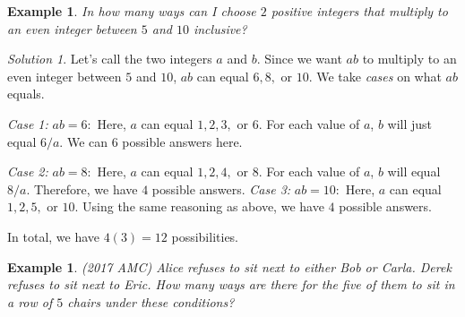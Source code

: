 \documentclass[letterpaper]{article}
\newtheorem{example}[thm]{Example}
\theoremstyle{remark}
\newtheorem*{solution}{Solution}
\theoremstyle{definition}
\begin{document}
\begin{example}
In how many ways can I choose $2$ positive integers that multiply to an even integer between $5$ and $10$ inclusive?
\end{example}

\begin{solution}


Let's call the two integers $a$ and $b$. Since we want $ab$ to multiply to an even integer between $5$ and $10$, $ab$ can equal $6, 8, $ or $10$. We take \textit{cases} on what $ab$ equals.
\newline

\textit{Case 1:} $ab=6:$ Here, $a$ can equal $1, 2, 3,$ or $6$. For each value of $a$, $b$ will just equal $6/a$. We can $6$ possible answers here.
\newline

\textit{Case 2:} $ab=8:$ Here, $a$ can equal $1, 2, 4,$ or $8$. For each value of $a$, $b$ will equal $8/a$. Therefore, we have $4$ possible answers.
\newline
\textit{Case 3:} $ab=10:$ Here, $a$ can equal $1, 2, 5,$ or $10$. Using the same reasoning as above, we have $4$ possible answers.
\newline

In total, we have $4(3)=12$ possibilities.
\end{solution}

\begin{example}
(2017 AMC) Alice refuses to sit next to either Bob or Carla. Derek refuses to sit next to Eric. How many ways are there for the five of them to sit in a row of $5$ chairs under these conditions?
\end{example}
\end{document}
